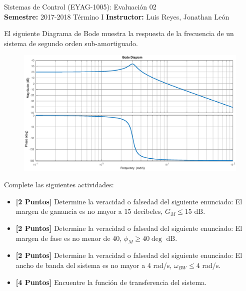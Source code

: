 \documentclass[ a4paper, twoside, 11pt]{article}
\newcommand{\numero}{02}
\begin{document}
\allowdisplaybreaks

\begin{center}
\Large Sistemas de Control (EYAG-1005): Evaluaci\'on \numero \\[1ex]
\small \textbf{Semestre:} 2017-2018 T\'ermino I \qquad
\textbf{Instructor:} Luis Reyes, Jonathan Le\'on
\end{center}
\halfskip



\begin{problem} El siguiente Diagrama de Bode muestra la respuesta de la frecuencia de un sistema de segundo orden sub-amortiguado. 

\begin{figure}[htb]
\centering
\includegraphics[width=\textwidth]{prob_bode-identificacion.eps}
\end{figure}

Complete las siguientes actividades: 
\begin{itemize}
\item \textbf{[2 Puntos]} Determine la veracidad o falsedad del siguiente enunciado: El margen de ganancia es no mayor a 15 decibeles, \ie $G_M \leq 15 \text{ dB}$. 
\item \textbf{[2 Puntos]} Determine la veracidad o falsedad del siguiente enunciado: El margen de fase es no menor de 40\deg, \ie $\phi_M \geq 40\deg \text{ dB}$. 
\item \textbf{[2 Puntos]} Determine la veracidad o falsedad del siguiente enunciado: El ancho de banda del sistema es no mayor a 4 rad/s, \ie $\omega_{BW} \leq 4$ rad/s. 
\item \textbf{[4 Puntos]} Encuentre la funci\'on de transferencia del sistema. 
\end{itemize}

\end{problem}
\vspace{\baselineskip}
\end{document}
